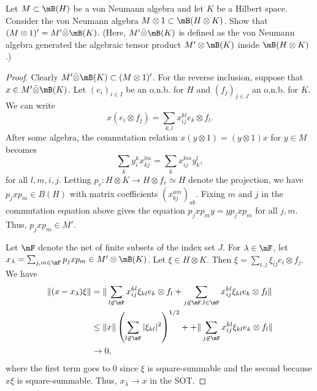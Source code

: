 \documentclass{article}
\begin{document}
 Let $M \subset \mB(H)$ be a von Neumann algebra and let $K$ be a Hilbert space. Consider the von
Neumann algebra $M \otimes 1 \subset \mB(H \otimes K)$. Show that $(M \otimes 1)' = M' \bar{\otimes} \mB(K)$.
(Here, $M' \bar{\otimes} \mB(K)$ is defined as the von Neumann algebra generated the algebraic
tensor product $M' \otimes \mB(K)$ inside $\mB(H \otimes K)$.)
\begin{proof}
  Clearly $M' \bar\otimes \mB(K) \subset (M \otimes 1)'$.  For the reverse inclusion, suppose that $x \in M' \bar\otimes \mB(K)$.
  Let $(e_i)_{i \in I}$ be an o.n.b. for $H$ and $(f_j)_{j \in J}$ an o.n.b. for $K$.  We can write
  $$x (e_i \otimes f_j) = \sum_{k,l} x^{kl}_{ij} e_k \otimes f_l.$$
  After some algebra, the commutation relation $x (y \otimes 1) = (y \otimes 1) x$ for $y \in M$ becomes
  $$\sum_k y_i^k x^{lm}_{kj} = \sum_k x_{ij}^{km} y^l_k,$$
  for all $l,m,i,j$.   Letting $p_r: H \otimes K \to H \otimes f_r \simeq H$ denote the projection, we have
  $p_j x p_m \in B(H)$ with matrix coefficients $(x^{a m}_{b j})_{ab}$.  Fixing $m$ and $j$ in the commutation equation above
  gives the equation $p_j x p_m y = y p_j x p_m$ for all $j,m$.  Thus, $p_j x p_m \in M'$.

  Let $\mF$ denote the net of finite subsets of the index set $J$.  For $\lambda \in \mF$, let
  $x_\lambda = \sum_{j,m \in \mF} p_j x p_m \in M' \otimes \mB(K)$.  Let $\xi \in H \otimes K$.
  Then $\xi = \sum_{i,j} \xi_{ij} e_i \otimes f_j$.  We have
  \begin{align*}
    \|(x - x_\lambda) \xi \| & = \| \sum_{l \not\in \mF} x^{kl}_{ij} \xi_{kl} e_k \otimes f_l
    + \sum_{j \not \in \mF, l \in \mF} x^{kl}_{ij} \xi_{kl} e_k \otimes f_l  \| \\
    & \le \|x\|  \left( \sum_{l \not\in \mF} |\xi_{kl}|^2 \right)^{1/2} + + \| \sum_{j \not \in \mF} x^{kl}_{ij} \xi_{kl} e_k \otimes f_l  \| \\
    & \to 0,
  \end{align*}
  where the first term goes to 0 since $\xi$ is square-summable and the second because $x \xi$ is square-summable.
  Thus, $x_\lambda \to x$ in the SOT. 
\end{proof}
\end{document}
